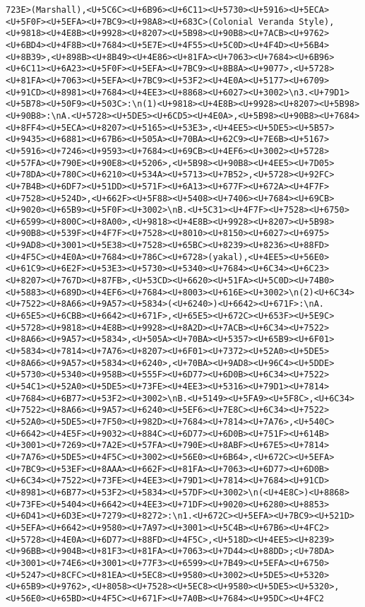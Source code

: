 \documentclass[
]{article}
\begin{document}
\begin{verbatim}
723E>(Marshall),<U+5C6C><U+6B96><U+6C11><U+5730><U+5916><U+5ECA><U+5F0F><U+5EFA><U+7BC9><U+98A8><U+683C>(Colonial Veranda Style),<U+9818><U+4E8B><U+9928><U+8207><U+5B98><U+90B8><U+7ACB><U+9762><U+6BD4><U+4F8B><U+7684><U+5E7E><U+4F55><U+5C0D><U+4F4D><U+56B4><U+8B39>,<U+898B><U+8B49><U+4E86><U+81FA><U+7063><U+7684><U+6B96><U+6C11><U+6A23><U+5F0F><U+5EFA><U+7BC9><U+8B8A><U+9077>,<U+5728><U+81FA><U+7063><U+5EFA><U+7BC9><U+53F2><U+4E0A><U+5177><U+6709><U+91CD><U+8981><U+7684><U+4EE3><U+8868><U+6027><U+3002>\n3.<U+79D1><U+5B78><U+50F9><U+503C>:\n(1)<U+9818><U+4E8B><U+9928><U+8207><U+5B98><U+90B8>:\nA.<U+5728><U+5DE5><U+6CD5><U+4E0A>,<U+5B98><U+90B8><U+7684><U+8FF4><U+5ECA><U+8207><U+5165><U+53E3>,<U+4EE5><U+5DE5><U+5B57><U+9435><U+6881><U+67B6><U+505A><U+70BA><U+62C9><U+7E6B><U+5167><U+5916><U+7246><U+9593><U+7684><U+69CB><U+4EF6><U+3002><U+5728><U+57FA><U+790E><U+90E8><U+5206>,<U+5B98><U+90B8><U+4EE5><U+7D05><U+78DA><U+780C><U+6210><U+534A><U+5713><U+7B52>,<U+5728><U+92FC><U+7B4B><U+6DF7><U+51DD><U+571F><U+6A13><U+677F><U+672A><U+4F7F><U+7528><U+524D>,<U+662F><U+5F88><U+5408><U+7406><U+7684><U+69CB><U+9020><U+65B9><U+5F0F><U+3002>\nB.<U+5C31><U+4F7F><U+7528><U+6750><U+6599><U+800C><U+8A00>,<U+9818><U+4E8B><U+9928><U+8207><U+5B98><U+90B8><U+539F><U+4F7F><U+7528><U+8010><U+8150><U+6027><U+6975><U+9AD8><U+3001><U+5E38><U+7528><U+65BC><U+8239><U+8236><U+88FD><U+4F5C><U+4E0A><U+7684><U+786C><U+6728>(yakal),<U+4EE5><U+56E0><U+61C9><U+6E2F><U+53E3><U+5730><U+5340><U+7684><U+6C34><U+6C23><U+8207><U+767D><U+87FB>,<U+53CD><U+6620><U+51FA><U+5C0D><U+74B0><U+5883><U+689D><U+4EF6><U+7684><U+8003><U+616E><U+3002>\n(2)<U+6C34><U+7522><U+8A66><U+9A57><U+5834>(<U+6240>)<U+6642><U+671F>:\nA.<U+65E5><U+6CBB><U+6642><U+671F>,<U+65E5><U+672C><U+653F><U+5E9C><U+5728><U+9818><U+4E8B><U+9928><U+8A2D><U+7ACB><U+6C34><U+7522><U+8A66><U+9A57><U+5834>,<U+505A><U+70BA><U+5357><U+65B9><U+6F01><U+5834><U+7814><U+7A76><U+8207><U+6F01><U+7372><U+52A0><U+5DE5><U+8A66><U+9A57><U+5834><U+6240>,<U+70BA><U+9AD8><U+96C4><U+5DDE><U+5730><U+5340><U+958B><U+555F><U+6D77><U+6D0B><U+6C34><U+7522><U+54C1><U+52A0><U+5DE5><U+73FE><U+4EE3><U+5316><U+79D1><U+7814><U+7684><U+6B77><U+53F2><U+3002>\nB.<U+5149><U+5FA9><U+5F8C>,<U+6C34><U+7522><U+8A66><U+9A57><U+6240><U+5EF6><U+7E8C><U+6C34><U+7522><U+52A0><U+5DE5><U+7F50><U+982D><U+7684><U+7814><U+7A76>,<U+540C><U+6642><U+4E5F><U+9032><U+884C><U+6D77><U+6D0B><U+751F><U+614B><U+3001><U+7269><U+7A2E><U+57FA><U+790E><U+8ABF><U+67E5><U+7814><U+7A76><U+5DE5><U+4F5C><U+3002><U+56E0><U+6B64>,<U+672C><U+5EFA><U+7BC9><U+53EF><U+8AAA><U+662F><U+81FA><U+7063><U+6D77><U+6D0B><U+6C34><U+7522><U+73FE><U+4EE3><U+79D1><U+7814><U+7684><U+91CD><U+8981><U+6B77><U+53F2><U+5834><U+57DF><U+3002>\n(<U+4E8C>)<U+8868><U+73FE><U+5404><U+6642><U+4EE3><U+71DF><U+9020><U+6280><U+8853><U+6D41><U+6D3E><U+7279><U+8272>:\n1.<U+672C><U+5EFA><U+7BC9><U+521D><U+5EFA><U+6642><U+9580><U+7A97><U+3001><U+5C4B><U+67B6><U+4FC2><U+5728><U+4E0A><U+6D77><U+88FD><U+4F5C>,<U+518D><U+4EE5><U+8239><U+96BB><U+904B><U+81F3><U+81FA><U+7063><U+7D44><U+88DD>;<U+78DA><U+3001><U+74E6><U+3001><U+77F3><U+6599><U+7B49><U+5EFA><U+6750><U+5247><U+8CFC><U+81EA><U+5EC8><U+9580><U+3002><U+5DE5><U+5320><U+65B9><U+9762>,<U+8058><U+7528><U+5EC8><U+9580><U+5DE5><U+5320>,<U+56E0><U+65BD><U+4F5C><U+671F><U+7A0B><U+7684><U+95DC><U+4FC2
\end{verbatim}
\end{document}
